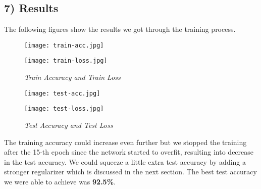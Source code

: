\documentclass[a4paper]{article}
\begin{document}
\subsection*{7) Results}
The following figures show the results we got through the training process.

   	\begin{figure}[H]
   		\centering
   		\begin{minipage}{0.7\textwidth}
   			\centering
   			\texttt{[image: train-acc.jpg]}
   		\end{minipage}%
   		\hspace*{-8.7em}
   		\begin{minipage}{0.7\textwidth}
   			\centering
   			\texttt{[image: train-loss.jpg]}
   		\end{minipage}
	\caption{\textit{Train Accuracy and Train Loss}}
   	\end{figure}
   	
   	\begin{figure}[H]
   		\begin{minipage}{0.7\textwidth}
   			\centering
   			\texttt{[image: test-acc.jpg]}
   		\end{minipage}%
   		\hspace*{-8.7em}
   		\begin{minipage}{0.7\textwidth}
   			\centering
   			\texttt{[image: test-loss.jpg]}
   		\end{minipage}
   		\caption{\textit{Test Accuracy and Test Loss}}
   	\end{figure}
The training accuracy could increase even further but we stopped the training after the 15-th epoch since the network started to overfit, resulting into decrease in the test accuracy. We could squeeze a little extra test accuracy by adding a stronger regularizer which is discussed in the next section.
The best test accuracy we were able to achieve was \textbf{92.5\%}.
\end{document}
